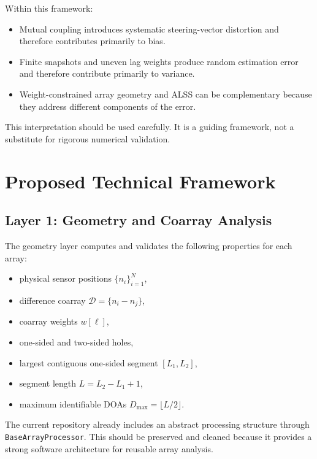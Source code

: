 \documentclass[11pt,letterpaper]{article}
\newcommand{\codepath}[1]{\texttt{#1}}
\newcommand{\ALSS}{\textsc{ALSS}}
\begin{document}
Within this framework:
\begin{itemize}[leftmargin=*]
    \item Mutual coupling introduces systematic steering-vector distortion and therefore contributes primarily to bias.
    \item Finite snapshots and uneven lag weights produce random estimation error and therefore contribute primarily to variance.
    \item Weight-constrained array geometry and \ALSS{} can be complementary because they address different components of the error.
\end{itemize}

This interpretation should be used carefully. It is a guiding framework, not a substitute for rigorous numerical validation.

\section{Proposed Technical Framework}

\subsection{Layer 1: Geometry and Coarray Analysis}

The geometry layer computes and validates the following properties for each array:
\begin{itemize}[leftmargin=*]
    \item physical sensor positions $\{n_i\}_{i=1}^{N}$,
    \item difference coarray $\mathcal{D}=\{n_i-n_j\}$,
    \item coarray weights $w[\ell]$,
    \item one-sided and two-sided holes,
    \item largest contiguous one-sided segment $[L_1,L_2]$,
    \item segment length $L=L_2-L_1+1$,
    \item maximum identifiable DOAs $D_{\max}=\lfloor L/2 \rfloor$.
\end{itemize}

The current repository already includes an abstract processing structure through \codepath{BaseArrayProcessor}. This should be preserved and cleaned because it provides a strong software architecture for reusable array analysis.
\end{document}
